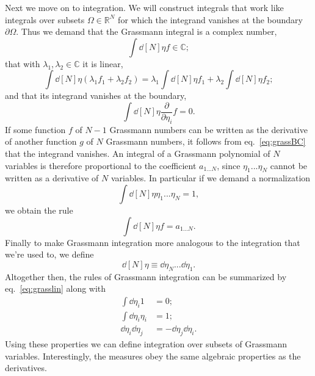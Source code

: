 Next we move on to integration. We will construct integrals that work like
integrals over subsets $\Omega\in\mathbb{R}^N$ for which 
the integrand vanishes at the boundary $\partial\Omega$. 
Thus we demand that the Grassmann integral is a complex number,
\begin{equation}
  \int\dd[N]{\eta}f\in\mathbb{C};
\end{equation}
that with $\lambda_1,\lambda_2\in\mathbb{C}$ it is linear,
\begin{equation}\label{eq:grasslin}
  \int\dd[N]{\eta}\left(\lambda_1f_1+\lambda_2f_2\right)
       =\lambda_1\int\dd[N]{\eta}f_1
         +\lambda_2\int\dd[N]{\eta}f_2;
\end{equation}
and that its integrand vanishes at the boundary,
\begin{equation}\label{eq:grassBC}
  \int\dd[N]{\eta}\frac{\partial}{\partial\eta_i}f=0.
\end{equation}
If some function $f$ of $N-1$ Grassmann numbers can be written as the 
derivative of another function $g$ of $N$ Grassmann numbers, it follows
from eq.~\eqref{eq:grassBC} that the integrand vanishes.
An integral of a Grassmann polynomial of $N$ variables is therefore
proportional to the coefficient $a_{1...N}$, since
$\eta_1...\eta_N$ cannot be written as a derivative of $N$ variables.
In particular if we demand a normalization
\begin{equation}\label{eq:grassnorm}
  \int\dd[N]{\eta}\eta_1...\eta_N=1,
\end{equation}
we obtain the rule
\begin{equation}
  \int\dd[N]{\eta}f=a_{1...N}.
\end{equation}
Finally to make Grassmann integration more analogous to the integration that
we're used to, we define
\begin{equation}
  \dd[N]{\eta}\equiv\dd{\eta_N}...\dd{\eta_1}.
\end{equation}
Altogether then, the rules of Grassmann integration can be summarized by
eq.~\eqref{eq:grasslin} along with
\begin{equation}\label{eq:grassintrules}\begin{aligned}
       \int\dd{\eta_i}1&=0;\\
  \int\dd{\eta_i}\eta_i&=1;\\
  \dd{\eta_i}\dd{\eta_j}&=-\dd{\eta_j}\dd{\eta_i}.
\end{aligned}\end{equation}
Using these properties we can define integration over subsets of Grassmann
variables. Interestingly, the measures obey the same algebraic properties as
the derivatives.

